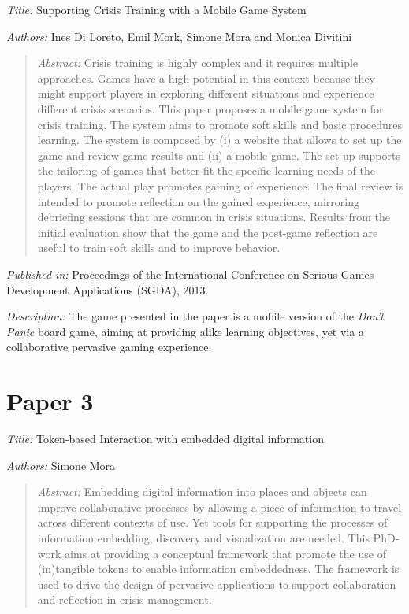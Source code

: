\emph{Title: }Supporting Crisis Training with a Mobile Game System

\emph{Authors: }Ines Di Loreto, Emil Mork, Simone Mora and Monica Divitini

\begin{quote}
	\emph{Abstract: }Crisis training is highly complex and it requires multiple approaches. Games have a high potential in this context because they might support players in exploring different situations and experience different crisis scenarios. This paper proposes a mobile game system for crisis training. The system aims to promote soft skills and basic procedures learning. The system is composed by (i) a website that allows to set up the game and review game results and (ii) a mobile game. The set up supports the tailoring of games that better fit the specific learning needs of the players. The actual play promotes gaining of experience. The final review is intended to promote reflection on the gained experience, mirroring debriefing sessions that are common in crisis situations. Results from the initial evaluation show that the game and the post-game reflection are useful to train soft skills and to improve behavior.	
\end{quote}

\emph{Published in: }Proceedings of the International Conference on Serious Games Development Applications (SGDA), 2013.

\emph{Description: }The game presented in the paper is a mobile version of the \emph{Don't Panic} board game, aiming at providing alike learning objectives, yet via a collaborative pervasive gaming experience.

\section*{Paper 3}

\emph{Title: }Token-based Interaction with embedded digital information

\emph{Authors: }Simone Mora

\begin{quote}
	\emph{Abstract: }Embedding digital information into places and objects can improve collaborative processes by allowing a piece of information to travel across different contexts of use. Yet tools for supporting the processes of information embedding, discovery and visualization are needed. This PhD-work aims at providing a conceptual framework that promote the use of (in)tangible tokens to enable information embeddedness. The framework is used to drive the design of pervasive applications to support collaboration and reflection in crisis management.
\end{quote}

